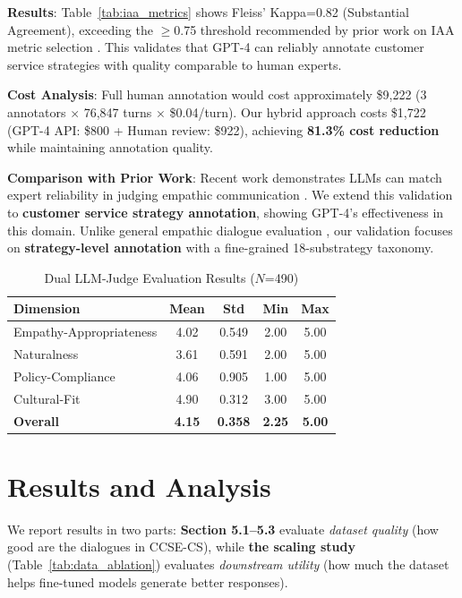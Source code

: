 \documentclass[11pt]{article}
\begin{document}
\textbf{Results}: Table~\ref{tab:iaa_metrics} shows Fleiss' Kappa=0.82 (Substantial Agreement), exceeding the $\ge$0.75 threshold recommended by prior work on IAA metric selection \cite{IAA_metric_selection_2024}. This validates that GPT-4 can reliably annotate customer service strategies with quality comparable to human experts.

\textbf{Cost Analysis}: Full human annotation would cost approximately \$9,222 (3 annotators $\times$ 76,847 turns $\times$ \$0.04/turn). Our hybrid approach costs \$1,722 (GPT-4 API: \$800 + Human review: \$922), achieving \textbf{81.3\% cost reduction} while maintaining annotation quality.

\textbf{Comparison with Prior Work}: Recent work demonstrates LLMs can match expert reliability in judging empathic communication \cite{nature_llm_empathy_2025}. We extend this validation to \textbf{customer service strategy annotation}, showing GPT-4's effectiveness in this domain. Unlike general empathic dialogue evaluation \cite{nature_llm_empathy_2025}, our validation focuses on \textbf{strategy-level annotation} with a fine-grained 18-substrategy taxonomy.


\begin{table}[t]
\centering
\caption{Dual LLM-Judge Evaluation Results ($N$=490)}
\label{tab:llm_judge_results}
\begin{tabular}{lcccc}
\toprule
\textbf{Dimension} & \textbf{Mean} & \textbf{Std} & \textbf{Min} & \textbf{Max} \\
\midrule
Empathy-Appropriateness & 4.02 & 0.549 & 2.00 & 5.00 \\
Naturalness & 3.61 & 0.591 & 2.00 & 5.00 \\
Policy-Compliance & 4.06 & 0.905 & 1.00 & 5.00 \\
Cultural-Fit & 4.90 & 0.312 & 3.00 & 5.00 \\
\midrule
\textbf{Overall} & \textbf{4.15} & \textbf{0.358} & \textbf{2.25} & \textbf{5.00} \\
\bottomrule
\end{tabular}
\end{table}

\section{Results and Analysis}

We report results in two parts: \textbf{Section 5.1--5.3} evaluate \textit{dataset quality} (how good are the dialogues in CCSE-CS), while \textbf{the scaling study} (Table~\ref{tab:data_ablation}) evaluates \textit{downstream utility} (how much the dataset helps fine-tuned models generate better responses).
\end{document}
